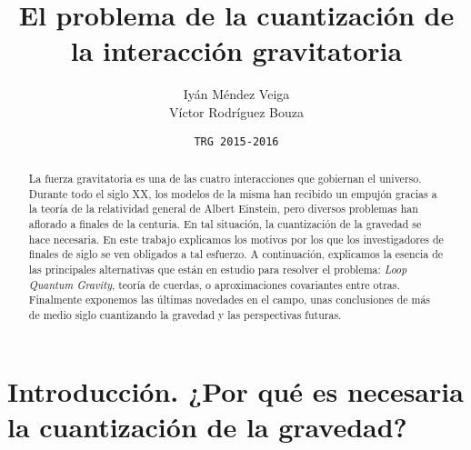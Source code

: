 \documentclass[11pt,a4paper,titlepage]{article}
\title{\Huge\textbf{El problema de la cuantización de la interacción gravitatoria}}
\author{\textsf{Iyán Méndez Veiga}\\ \textsf{Víctor Rodríguez Bouza}}
\date{\texttt{TRG 2015-2016}}
\begin{document}
\begin{titlepage}

\end{titlepage}
%
%
\newpage
\tableofcontents
\newpage
%
%
\begin{abstract}
La fuerza gravitatoria es una de las cuatro interacciones que gobiernan el universo. Durante todo el siglo XX, los modelos de la misma han recibido un empujón gracias a la teoría de la relatividad general de Albert Einstein, pero diversos problemas han aflorado a finales de la centuria. En tal situación, la cuantización de la gravedad se hace necesaria. En este trabajo explicamos los motivos por los que los investigadores de finales de siglo se ven obligados a tal esfuerzo. A continuación, explicamos la esencia de las principales alternativas que están en estudio para resolver el problema: \textit{Loop Quantum Gravity}, teoría de cuerdas, o aproximaciones covariantes entre otras. Finalmente exponemos las últimas novedades en el campo, unas conclusiones de más de medio siglo cuantizando la gravedad y las perspectivas futuras.
\end{abstract}
%
%
\section{Introducción. ¿Por qué es necesaria la cuantización de la gravedad?} %
\end{document}
